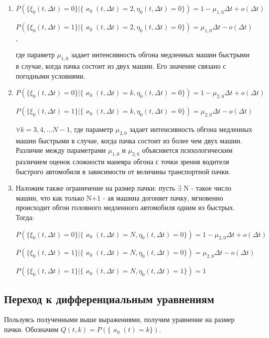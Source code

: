 \documentclass[a4paper, 14pt, russian]{article}
\begin{document}
\begin{enumerate}
\item $P(\{\xi_0(t, \Delta t) = 0\} | \{\varkappa_0(t, \Delta t) = 2, \eta_0(t, \Delta t) = 0\}) =  1 - \mu_{1, 0} \Delta t + o(\Delta t)$

$P(\{\xi_0(t, \Delta t) = 1\} | \{\varkappa_0(t, \Delta t) = 2, \eta_0(t, \Delta t) = 0\}) =  \mu_{1, 0} \Delta t - o(\Delta t)$, 

где параметр $\mu_{1,0}$ задает интенсивность обгона медленных машин быстрыми в случае, когда пачка состоит из двух машин. Его значение связано с погодными условиями.

\item $P(\{\xi_0(t, \Delta t) = 0\} | \{\varkappa_0(t, \Delta t) = k, \eta_0(t, \Delta t) = 0\}) =  1 - \mu_{2, 0} \Delta t + o(\Delta t)$

$P(\{\xi_0(t, \Delta t) = 1\} | \{\varkappa_0(t, \Delta t) = k, \eta_0(t, \Delta t) = 0\}) =  \mu_{2, 0} \Delta t - o(\Delta t)$ 

$\forall k = 3, 4, ... N -1$, где параметр $\mu_{2,0}$ задает интенсивность обгона медленных машин быстрыми в случае, когда пачка состоит из более чем двух машин. Различие между параметрами $\mu_{1,0}$ и $\mu_{2,0}$ объясняется психологическим различием оценок сложности маневра обгона с точки зрения водителя быстрого автомобиля в зависимости от величины транспортной пачки.

\item Наложим также ограничение на размер пачки: пусть $\exists$ N - такое число машин, что как только N+1 - ая машина догоняет пачку, мгновенно происходит обгон головного медленного автомобиля одним из быстрых. Тогда:

$P(\{\xi_0(t, \Delta t) = 0\} | \{\varkappa_0(t, \Delta t) = N, \eta_0(t, \Delta t) = 0\}) = 1 -  \mu_{2, 0} \Delta t + o(\Delta t)$ 

$P(\{\xi_0(t, \Delta t) = 1\} | \{\varkappa_0(t, \Delta t) = N, \eta_0(t, \Delta t) = 0\}) = \mu_{2, 0} \Delta t - o(\Delta t)$ 

 $P(\{\xi_0(t, \Delta t) = 1\} | \{\varkappa_0(t, \Delta t) = N, \eta_0(t, \Delta t) = 1\}) = 1$

\end{enumerate} 

\subsection{Переход к дифференциальным уравнениям}

Пользуясь полученными выше выражениями, получим уравнение на размер пачки. Обозначим $Q(t, k) = P(\{\varkappa_0(t) = k\})$.
\end{document}

